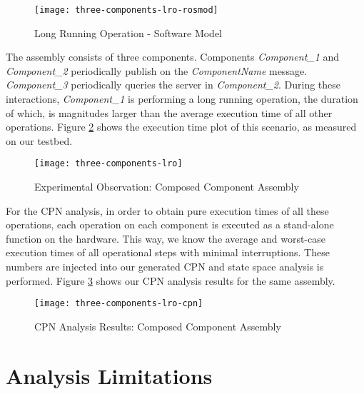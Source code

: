 \begin{figure}[h]
	\centering
	\texttt{[image: three-components-lro-rosmod]}
	\caption{Long Running Operation - Software Model}
	\label{fig:three-components-lro-rosmod}
\end{figure}
\FloatBarrier

The assembly consists of three components. Components \emph{Component\_1} and \emph{Component\_2} periodically publish on the \emph{ComponentName} message. \emph{Component\_3} periodically queries the server in \emph{Component\_2}. During these interactions, \emph{Component\_1} is performing a long running operation, the duration of which, is magnitudes larger than the average execution time of all other operations. Figure \ref{fig:three-components-lro} shows the execution time plot of this scenario, as measured on our testbed. 

\begin{figure}[h]
	\centering
	\texttt{[image: three-components-lro]}
	\caption{Experimental Observation: Composed Component Assembly}
	\label{fig:three-components-lro}
\end{figure}
\FloatBarrier

For the CPN analysis, in order to obtain pure execution times of all these operations, each operation on each component is executed as a stand-alone function on the hardware. This way, we know the average and worst-case execution times of all operational steps with minimal interruptions. These numbers are injected into our generated CPN and state space analysis is performed. Figure \ref{fig:three-components-lro-cpn} shows our CPN analysis results for the same assembly.


\begin{figure}[h]
	\centering
	\texttt{[image: three-components-lro-cpn]}
	\caption{CPN Analysis Results: Composed Component Assembly}
	\label{fig:three-components-lro-cpn}
\end{figure}
\FloatBarrier

\section{Analysis Limitations}

